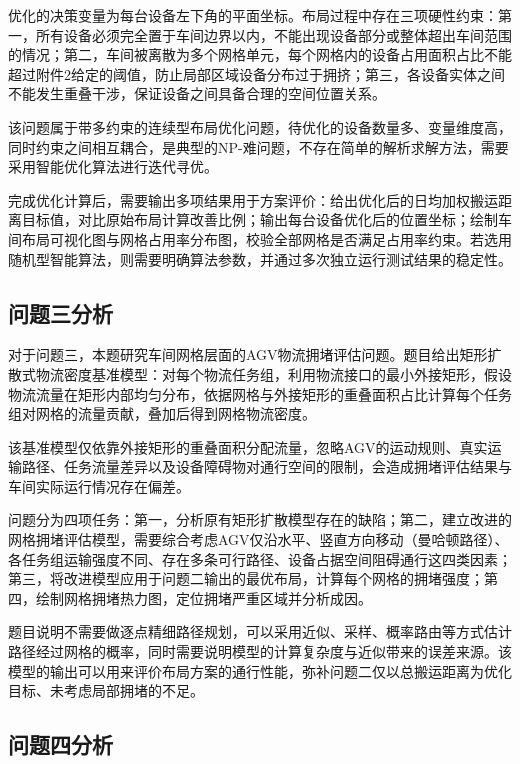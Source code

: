 \documentclass[12pt,a4paper]{article}
\begin{document}
	优化的决策变量为每台设备左下角的平面坐标。布局过程中存在三项硬性约束：第一，所有设备必须完全置于车间边界以内，不能出现设备部分或整体超出车间范围的情况；第二，车间被离散为多个网格单元，每个网格内的设备占用面积占比不能超过附件2给定的阈值，防止局部区域设备分布过于拥挤；第三，各设备实体之间不能发生重叠干涉，保证设备之间具备合理的空间位置关系。
	
	该问题属于带多约束的连续型布局优化问题，待优化的设备数量多、变量维度高，同时约束之间相互耦合，是典型的NP-难问题，不存在简单的解析求解方法，需要采用智能优化算法进行迭代寻优\cite{sun2025slp}。
	
	完成优化计算后，需要输出多项结果用于方案评价：给出优化后的日均加权搬运距离目标值，对比原始布局计算改善比例；输出每台设备优化后的位置坐标；绘制车间布局可视化图与网格占用率分布图，校验全部网格是否满足占用率约束。若选用随机型智能算法，则需要明确算法参数，并通过多次独立运行测试结果的稳定性。
	
	\subsection{问题三分析}
	
	对于问题三，本题研究车间网格层面的AGV物流拥堵评估问题。题目给出矩形扩散式物流密度基准模型：对每个物流任务组，利用物流接口的最小外接矩形，假设物流流量在矩形内部均匀分布，依据网格与外接矩形的重叠面积占比计算每个任务组对网格的流量贡献，叠加后得到网格物流密度。
	
	该基准模型仅依靠外接矩形的重叠面积分配流量，忽略AGV的运动规则、真实运输路径、任务流量差异以及设备障碍物对通行空间的限制\cite{wang2026transport}，会造成拥堵评估结果与车间实际运行情况存在偏差。
	
	问题分为四项任务：第一，分析原有矩形扩散模型存在的缺陷；第二，建立改进的网格拥堵评估模型，需要综合考虑AGV仅沿水平、竖直方向移动（曼哈顿路径）、各任务组运输强度不同、存在多条可行路径、设备占据空间阻碍通行这四类因素；第三，将改进模型应用于问题二输出的最优布局，计算每个网格的拥堵强度；第四，绘制网格拥堵热力图，定位拥堵严重区域并分析成因。
	
	题目说明不需要做逐点精细路径规划，可以采用近似、采样、概率路由等方式估计路径经过网格的概率，同时需要说明模型的计算复杂度与近似带来的误差来源。该模型的输出可以用来评价布局方案的通行性能，弥补问题二仅以总搬运距离为优化目标、未考虑局部拥堵的不足。
	
	\subsection{问题四分析}
	
\end{document}
